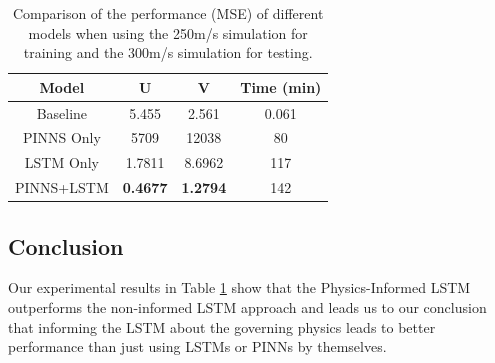 \begin{table}[!ht] \centering
    \begin{tabular}{c|c|c|c}
        \textbf{Model} & \textbf{U} & \textbf{V} & \textbf{Time (min)} \\ \hline
        Baseline & 5.455 & 2.561 & 0.061 \\ \hline
        PINNS Only & 5709 & 12038 & 80 \\ \hline
        LSTM Only & 1.7811 & 8.6962 & 117 \\ \hline
        PINNS+LSTM & \textbf{0.4677} & \textbf{1.2794} & 142 \\ \hline
    \end{tabular}
    \caption{Comparison of the performance (MSE) of different models when using the 250m/s simulation for training and the 300m/s simulation for testing.}
    \label{tab:physics_lstm_results}
\end{table}


\subsection{Conclusion}
Our experimental results in Table \ref{tab:physics_lstm_results} show that the Physics-Informed LSTM outperforms the non-informed LSTM approach and leads us to our conclusion that informing the LSTM about the governing physics leads to better performance than just using LSTMs or PINNs by themselves.
